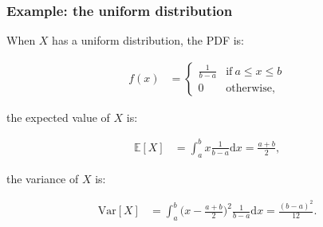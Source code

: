 \documentclass{beamer}
\begin{document}
\begin{frame}
\frametitle{Example: the uniform distribution}

When $X$ has a uniform distribution, the PDF is:

\vspace{-.3cm}

\begin{align*}
    f(x) &= 
    \begin{cases}
      \frac{1}{b-a} & \text{if}\ a \leq x \leq b \\
      0 & \text{otherwise,}
    \end{cases}
\end{align*}

the expected value of $X$ is:

\vspace{-.3cm}

\begin{align*}
    \mathbb{E}[X] &= \int_{a}^b x \frac{1}{b-a} \mathrm{d}x = \frac{a + b}{2},
\end{align*}

the variance of $X$ is:

\vspace{-.3cm}

\begin{align*}
    \mathrm{Var}[X] &= \int_a^b \bigg(x - \frac{a + b}{2}\bigg)^2 \frac{1}{b-a} \mathrm{d}x = \frac{(b-a)^2}{12}.
\end{align*}




\end{frame}
\end{document}
